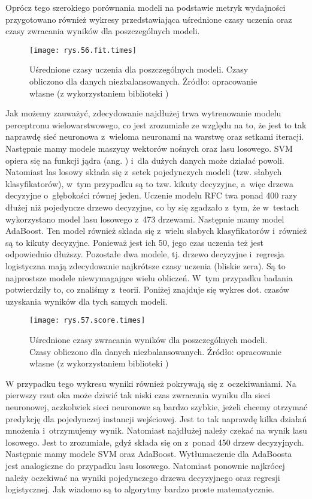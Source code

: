 Oprócz tego szerokiego porównania modeli na podstawie metryk wydajności przygotowano również wykresy przedstawiająca uśrednione czasy uczenia oraz czasy zwracania wyników dla poszczególnych modeli. 
\begin{figure}[!h]
    \centering
    \texttt{[image: rys.56.fit.times]}
    \caption{Uśrednione czasy uczenia dla poszczególnych modeli. Czasy obliczono dla danych niezbalansowanych. Źródło: opracowanie własne (z wykorzystaniem biblioteki )}
    \label{rys.56.fit.times}
\end{figure}
Jak możemy zauważyć, zdecydowanie najdłużej trwa wytrenowanie modelu perceptronu wielowarstwowego, co jest zrozumiałe ze względu na to, że jest to tak naprawdę sieć neuronowa z~wieloma neuronami na warstwę oraz setkami iteracji. Następnie mamy modele maszyny wektorów nośnych oraz lasu losowego. SVM opiera się na funkcji jądra (ang. ) i~dla dużych danych może działać powoli. Natomiast las losowy składa się z~setek pojedynczych modeli (tzw. słabych klasyfikatorów), w~tym przypadku są to tzw. kikuty decyzyjne, a~więc drzewa decyzyjne o~głębokości równej jeden. Uczenie modelu RFC twa ponad 400 razy dłużej niż pojedyncze drzewo decyzyjne, co by się zgadzało z~tym, że w~testach wykorzystano model lasu losowego z~473 drzewami. Następnie mamy model AdaBoost. Ten model również składa się z~wielu słabych klasyfikatorów i~również są to kikuty decyzyjne. Ponieważ jest ich 50, jego czas uczenia też jest odpowiednio dłuższy. Pozostałe dwa modele, tj. drzewo decyzyjne i~regresja logistyczna mają zdecydowanie najkrótsze czasy uczenia (bliskie zera). Są to najprostsze modele niewymagające wielu obliczeń. W~tym przypadku badania potwierdziły to, co znaliśmy z~teorii. Poniżej znajduje się wykres dot. czasów uzyskania wyników dla tych samych modeli.
\begin{figure}[h]
    \centering
    \texttt{[image: rys.57.score.times]}
    \caption{Uśrednione czasy zwracania wyników dla poszczególnych modeli. Czasy obliczono dla danych niezbalansowanych. Źródło: opracowanie własne (z wykorzystaniem biblioteki )}
    \label{rys.57.score.times}
\end{figure}
W przypadku tego wykresu wyniki również pokrywają się z~oczekiwaniami. Na pierwszy rzut oka może dziwić tak niski czas zwracania wyniku dla sieci neuronowej, aczkolwiek sieci neuronowe są bardzo szybkie, jeżeli chcemy otrzymać predykcję dla pojedynczej instancji wejściowej. Jest to tak naprawdę kilka działań mnożenia i~otrzymujemy wynik. Natomiast najdłużej należy czekać na wynik lasu losowego. Jest to zrozumiałe, gdyż składa się on z~ponad 450 drzew decyzyjnych. Następnie mamy modele SVM oraz AdaBoost. Wytłumaczenie dla AdaBoosta jest analogiczne do przypadku lasu losowego. Natomiast ponownie najkrócej należy oczekiwać na wyniki pojedynczego drzewa decyzyjnego oraz regresji logistycznej. Jak wiadomo są to algorytmy bardzo proste matematycznie.

